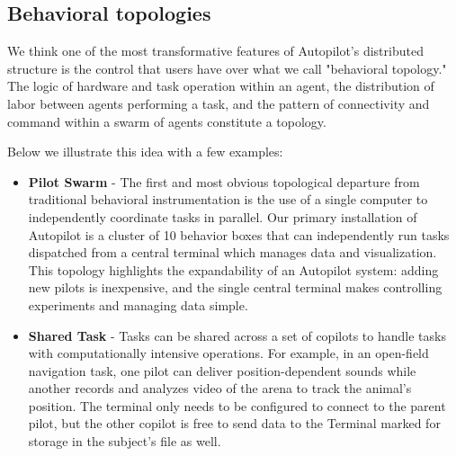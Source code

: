 \subsection{Behavioral topologies}
\label{sec:topology}

We think one of the most transformative features of Autopilot's distributed structure is the control that users have over what we call "behavioral topology." The logic of hardware and task operation within an agent, the distribution of labor between agents performing a task, and the pattern of connectivity and command within a swarm of agents constitute a topology. 

Below we illustrate this idea with a few examples:

\clearpage

\begin{itemize}
    \item \textbf{Pilot Swarm} - The first and most obvious topological departure from traditional behavioral instrumentation is the use of a single computer to independently coordinate tasks in parallel. Our primary installation of Autopilot is a cluster of 10 behavior boxes that can independently run tasks dispatched from a central terminal which manages data and visualization. This topology highlights the expandability of an Autopilot system: adding new pilots is inexpensive, and the single central terminal makes controlling experiments and managing data simple.
    \item \textbf{Shared Task} -  Tasks can be shared across a set of copilots to handle tasks with computationally intensive operations. For example, in an open-field navigation task, one pilot can deliver position-dependent sounds while another records and analyzes video of the arena to track the animal's position. The terminal only needs to be configured to connect to the parent pilot, but the other copilot is free to send data to the Terminal marked for storage in the subject's file as well.

\end{itemize}
